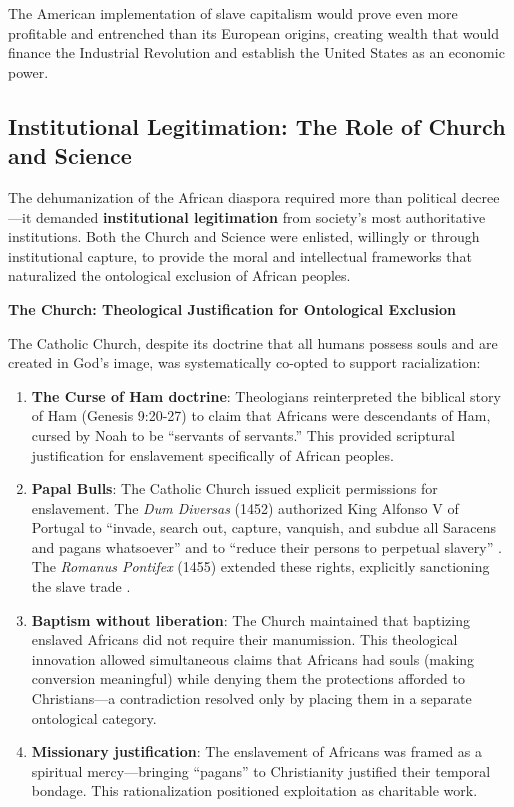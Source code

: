 \documentclass[12pt]{article}
\begin{document}
The American implementation of slave capitalism would prove even more profitable and entrenched than its European origins, creating wealth that would finance the Industrial Revolution and establish the United States as an economic power.

\subsection{Institutional Legitimation: The Role of Church and Science}

The dehumanization of the African diaspora required more than political decree---it demanded \textbf{institutional legitimation} from society's most authoritative institutions. Both the Church and Science were enlisted, willingly or through institutional capture, to provide the moral and intellectual frameworks that naturalized the ontological exclusion of African peoples.

\textbf{The Church: Theological Justification for Ontological Exclusion}

The Catholic Church, despite its doctrine that all humans possess souls and are created in God's image, was systematically co-opted to support racialization:

\begin{enumerate}
    \item \textbf{The Curse of Ham doctrine}: Theologians reinterpreted the biblical story of Ham (Genesis 9:20-27) to claim that Africans were descendants of Ham, cursed by Noah to be ``servants of servants.'' This provided scriptural justification for enslavement specifically of African peoples.
    
    \item \textbf{Papal Bulls}: The Catholic Church issued explicit permissions for enslavement. The \textit{Dum Diversas} (1452) authorized King Alfonso V of Portugal to ``invade, search out, capture, vanquish, and subdue all Saracens and pagans whatsoever'' and to ``reduce their persons to perpetual slavery'' \cite{dumdiversas}. The \textit{Romanus Pontifex} (1455) extended these rights, explicitly sanctioning the slave trade \cite{romanuspontifex}.
    
    \item \textbf{Baptism without liberation}: The Church maintained that baptizing enslaved Africans did not require their manumission. This theological innovation allowed simultaneous claims that Africans had souls (making conversion meaningful) while denying them the protections afforded to Christians---a contradiction resolved only by placing them in a separate onto\-logical category.
    
    \item \textbf{Missionary justification}: The enslavement of Africans was framed as a spiritual mercy---bringing ``pagans'' to Christianity justified their temporal bondage. This rationalization positioned exploitation as charitable work.
\end{enumerate}
\end{document}

